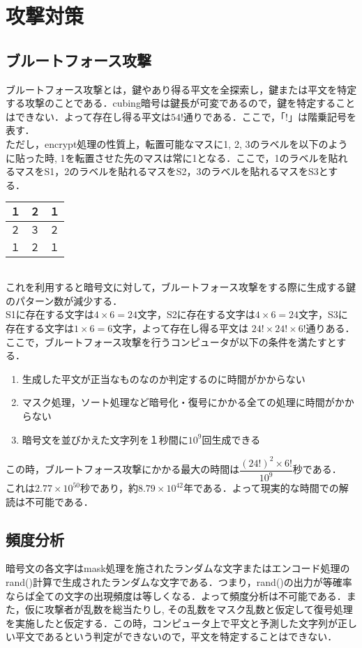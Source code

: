 \documentclass[a4p]{jarticle}
\begin{document}
\section{攻撃対策}
\subsection{ブルートフォース攻撃}
ブルートフォース攻撃とは，鍵やあり得る平文を全探索し，鍵または平文を特定する攻撃のことである．cubing暗号は鍵長が可変であるので，鍵を特定することはできない．よって存在し得る平文は\(54!\)通りである．ここで，「\(!\)」は階乗記号を表す．\\
ただし，encrypt処理の性質上，転置可能なマスに1, 2, 3のラベルを以下のように貼った時, 1を転置させた先のマスは常に1となる．ここで，1のラベルを貼れるマスをS1，2のラベルを貼れるマスをS2，3のラベルを貼れるマスをS3とする．\\
\begin{table}[htb]
  \begin{tabular}{|l|c|r|} \hline
    １ & ２ & １ \\ \hline
    ２ & ３ & ２ \\ \hline
    １ & ２ & １ \\ \hline
  \end{tabular}
\end{table}\\
これを利用すると暗号文に対して，ブルートフォース攻撃をする際に生成する鍵のパターン数が減少する．\\
S1に存在する文字は\(4\times6=24\)文字，S2に存在する文字は\(4\times6=24\)文字，S3に存在する文字は\(1\times6=6\)文字，よって存在し得る平文は \(24!\times24!\times6!\)通りある．\\
ここで，ブルートフォース攻撃を行うコンピュータが以下の条件を満たすとする．
\begin{enumerate}
  \item 生成した平文が正当なものなのか判定するのに時間がかからない
  \item マスク処理，ソート処理など暗号化・復号にかかる全ての処理に時間がかからない
  \item 暗号文を並びかえた文字列を１秒間に\(10^9\)回生成できる
\end{enumerate}
この時，ブルートフォース攻撃にかかる最大の時間は\(\dfrac{(24!)^2\times6!}{10^9}\)秒である．\\
これは\(2.77\times10^{50}\)秒であり，約\(8.79\times10^{42}\)年である．よって現実的な時間での解読は不可能である．

\subsection{頻度分析}
暗号文の各文字はmask処理を施されたランダムな文字またはエンコード処理のrand()計算で生成されたランダムな文字である．つまり，rand()の出力が等確率ならば全ての文字の出現頻度は等しくなる．よって頻度分析は不可能である．また，仮に攻撃者が乱数を総当たりし, その乱数をマスク乱数と仮定して復号処理を実施したと仮定する．この時，コンピュータ上で平文と予測した文字列が正しい平文であるという判定ができないので，平文を特定することはできない．
\end{document}
